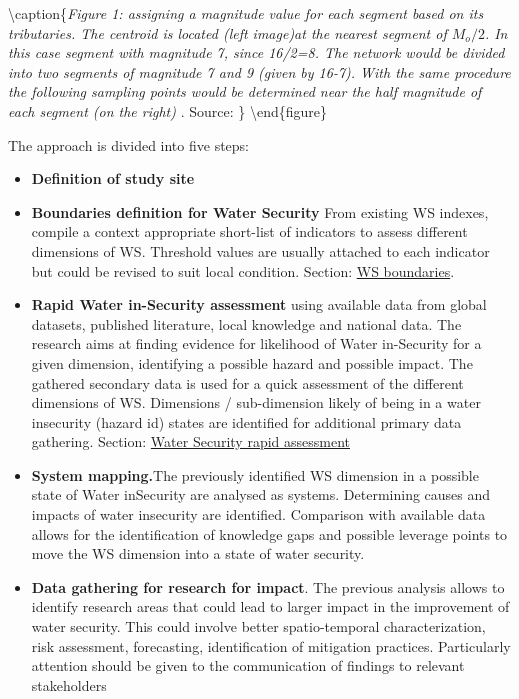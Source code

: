 \documentclass[
]{book}
\begin{document}
\textbackslash caption\{\emph{Figure 1: assigning a magnitude value for each segment based on its tributaries. The centroid is located (left image)at the nearest segment of \(M_o/2\). In this case segment with magnitude 7, since 16/2=8. The network would be divided into two segments of magnitude 7 and 9 (given by 16-7). With the same procedure the following sampling points would be determined near the half magnitude of each segment (on the right)} . Source: \citet{Sharp1971}\}\label{fig:sharp01}
\textbackslash end\{figure\}

The approach is divided into five steps:

\begin{itemize}
\item
  \textbf{Definition of study site}
\item
  \textbf{Boundaries definition for Water Security}
  From existing WS indexes, compile a context appropriate short-list of indicators to assess different dimensions of WS.
  Threshold values are usually attached to each indicator but could be revised to suit local condition. Section: \protect\hyperlink{boundaries}{WS boundaries}.
\item
  \textbf{Rapid Water in-Security assessment} using available data from global datasets, published literature, local knowledge and national data. The research aims at finding evidence for likelihood of Water in-Security for a given dimension, identifying a possible hazard and possible impact. The gathered secondary data is used for a quick assessment of the different dimensions of WS. Dimensions / sub-dimension likely of being in a water insecurity (hazard id) states are identified for additional primary data gathering. Section: \protect\hyperlink{water-security-rapid-assessment}{Water Security rapid assessment}
\item
  \textbf{System mapping.}The previously identified WS dimension in a possible state of Water inSecurity are analysed as systems. Determining causes and impacts of water insecurity are identified. Comparison with available data allows for the identification of knowledge gaps and possible leverage points to move the WS dimension into a state of water security.
\item
  \textbf{Data gathering for research for impact}. The previous analysis allows to identify research areas that could lead to larger impact in the improvement of water security. This could involve better spatio-temporal characterization, risk assessment, forecasting, identification of mitigation practices. Particularly attention should be given to the communication of findings to relevant stakeholders
\end{itemize}
\end{document}
